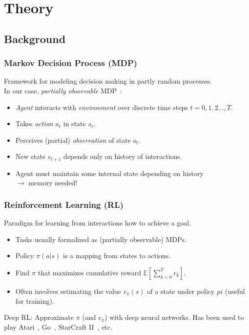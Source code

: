 \section{Theory}

\subsection{Background}

\begin{frame}
    \frametitle{Markov Decision Process (MDP)}
    
    Framework for modeling decision making in partly random processes.\\
    In our case, \textit{partially observable} MDP~\cite{kaelbling_pomdp_1998}:

    \begin{itemize}
        \item \textit{Agent} interacts with \textit{environment} over discrete time steps \(t = 0, 1, 2\dots, T\).
        \item Takes \textit{action} \(a_t\) in state \(s_t\).
        \item Perceives (partial) \textit{observation} of state \(o_t\).
        \item New state \(s_{t+1}\) depends only on history of interactions.
        \item Agent must maintain some internal state depending on history \\
        \(\rightarrow\) memory needed!
    \end{itemize}

    \begin{figure}
        \centering
        \scalebox{0.75}{}
    \end{figure}
\end{frame}

\begin{frame}
    \frametitle{Reinforcement Learning (RL)}

    Paradigm for learning from interactions how to achieve a goal.

    \begin{itemize}
        \item Tasks usually formalized as (partially observable) MDPs.
        \item Policy \(\pi(a|s)\) is a mapping from states to actions.
        \item Find \(\pi\) that maximizes cumulative reward \(\mathbb{E} \left\lbrack \sum_{k=0}^{T} r_k \right\rbrack\).
        \item Often involves estimating the value \(v_\pi(s)\) of a state under policy \(pi\) (useful for training). 
    \end{itemize}

    Deep RL: Approximate \(\pi\) (and \(v_\pi\)) with deep neural networks.
    Has been used to play Atari~\cite{mnih_human_2015}, Go~\cite{silver_alphago_2016}, StarCraft II~\cite{vinyals_alphastar_2019}, etc.

\end{frame}

